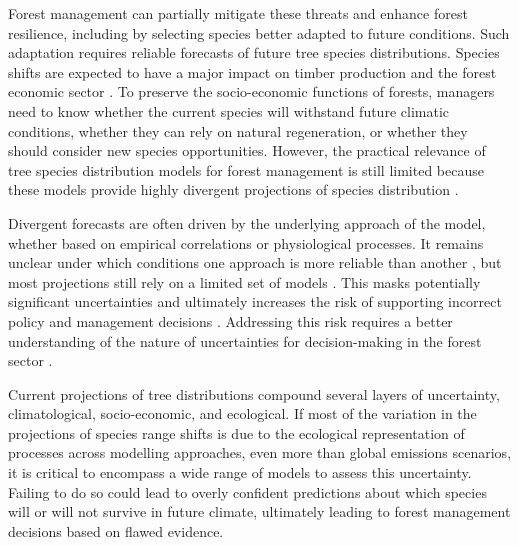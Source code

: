 \documentclass[11pt,letter]{article}
\begin{document}
Forest management can partially mitigate these threats and enhance forest resilience, including by selecting species better adapted to future conditions. Such adaptation requires reliable forecasts of future tree species distributions.
Species shifts are expected to have a major impact on timber production and the forest economic sector \citep{Wessely2024, Hanewinkel2013}. To preserve the socio-economic functions of forests, managers need to know whether the current species will withstand future climatic conditions, whether they can rely on natural regeneration, or whether they should consider new species opportunities. However, the practical relevance of tree species distribution models for forest management is still limited because these models provide highly divergent projections of species distribution \citep{Morin2009, Keenan2011a, Cheaib2012, Bugmann2019, Takolander2019, Mahnken2022}.

Divergent forecasts are often driven by the underlying approach of the model, whether based on empirical correlations or physiological processes. It remains unclear under which conditions one approach is more reliable than another \citep{VanderMeersch2025}, but most projections still rely on a limited set of models \citep{Dyderski2018, Wessely2024, Hanewinkel2013, Schueler2014}. This masks potentially significant uncertainties and ultimately increases the risk of supporting incorrect policy and management decisions \citep{Dawson2011}. Addressing this risk requires a better understanding of the nature of uncertainties for decision-making in the forest sector \citep{Urban2016, Saltelli2020, Johnson2024, Simmonds2024}. 

Current projections of tree distributions compound several layers of uncertainty, climatological, socio-economic, and ecological. If most of the variation in the projections of species range shifts is due to the ecological representation of processes across modelling approaches, even more than global emissions scenarios, it is critical to encompass a wide range of models to assess this uncertainty. Failing to do so could lead to overly confident predictions about which species will or will not survive in future climate, ultimately leading to forest management decisions based on flawed evidence. %
\end{document}
